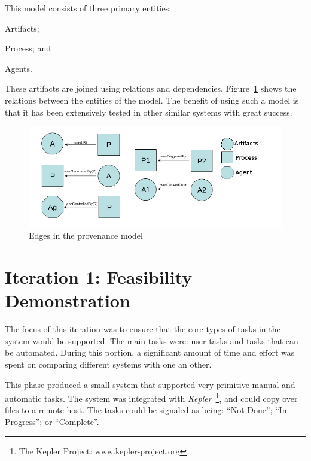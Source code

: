 \begin{description}
        This model consists of three primary entities: \begin{inparaenum}[(i)]
        \item Artifacts; \item Process; and \item Agents.\end{inparaenum} These
        artifacts are joined using relations and dependencies.
        Figure~\ref{provenance}  shows the relations between the entities of
        the model. The benefit of using such a model is that it has been
        extensively tested in other similar systems with great success.
        \begin{figure}[!hb]
            \begin{center}
                \includegraphics[scale=0.5]{figures/provenance_edges.png}
            \end{center}
            \caption{Edges in the provenance model}
            \label{provenance}
        \end{figure}
\end{description}

\section{Iteration 1: Feasibility Demonstration\label{feasibility}}

The focus of this iteration was to ensure that the core types of tasks
in the system would be supported. The main tasks were: user-tasks and tasks
that can be automated. During this portion, a significant amount of time and
effort was spent on comparing different systems with one an other.

This phase produced a small system that supported very primitive manual and automatic
tasks. The system was integrated with \emph{Kepler}~\footnote{
The Kepler Project: www.kepler-project.org }, and could copy over files to a remote
host. The tasks could be signaled as being: ``Not Done''; ``In Progress''; or ``Complete''.


